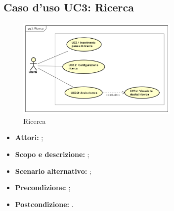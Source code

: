 \documentclass[12pt,a4paper,titlepage]{article}
\begin{document}
\subsection{Caso d'uso UC3: Ricerca}
\begin{figure}[H]
	\centering
	\includegraphics[width=0.7\textwidth]{UseCase/Ricerca}
	\caption{Ricerca}
\end{figure}
\begin{itemize}
	\item \textbf{Attori: };
	\item \textbf{Scopo e descrizione: };
	\item \textbf{Scenario alternativo: };
	\item \textbf{Precondizione: };
	\item \textbf{Postcondizione: }.
\end{itemize}
\end{document}
